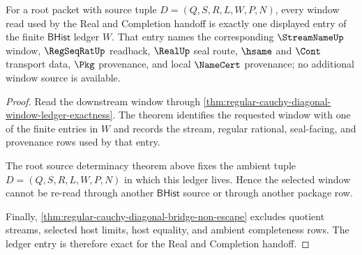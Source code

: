 \begin{theorem}
\label{thm:regular-cauchy-diagonal-root-window-ledger-exactness}
For a root packet with source tuple $D=(Q,S,R,L,W,P,N)$, every window read used by the Real and Completion handoff is exactly one displayed entry of the finite $\mathsf{BHist}$ ledger $W$. That entry names the corresponding $\StreamNameUp$ window, $\RegSeqRatUp$ readback, $\RealUp$ seal route, $\hsame$ and $\Cont$ transport data, $\Pkg$ provenance, and local $\NameCert$ provenance; no additional window source is available.
\end{theorem}
\begin{proof}
Read the downstream window through \autoref{thm:regular-cauchy-diagonal-window-ledger-exactness}. The theorem identifies the requested window with one of the finite entries in $W$ and records the stream, regular rational, seal-facing, and provenance rows used by that entry.

The root source determinacy theorem above fixes the ambient tuple $D=(Q,S,R,L,W,P,N)$ in which this ledger lives. Hence the selected window cannot be re-read through another $\mathsf{BHist}$ source or through another package row.

Finally, \autoref{thm:regular-cauchy-diagonal-bridge-non-escape} excludes quotient streams, selected host limits, host equality, and ambient completeness rows. The ledger entry is therefore exact for the Real and Completion handoff.
\end{proof}

